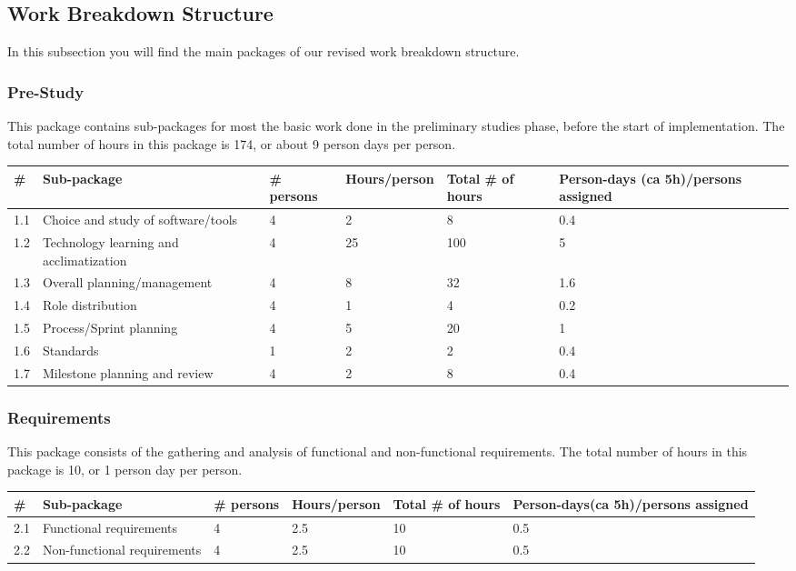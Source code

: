 \subsection{Work Breakdown Structure}
In this subsection you will find the main packages of our revised work breakdown structure.

\subsubsection{Pre-Study}
This package contains sub-packages for most the basic work done in the preliminary studies phase, before the start of implementation. The total number of hours in this package is 174, or about 9 person days per person.
\begin{longtable}{|p{0.7cm}|p{3cm}|p{1.8cm}|p{2.5cm}|p{2cm}|p{2.8cm}|}
\hline
\# & Sub-package & \# persons & Hours/person & Total \# of hours & Person-days (ca 5h)/persons assigned\\ 
\hline
1.1 & Choice and study of software/tools & 4 & 2 & 8 & 0.4\\ 
\hline
1.2 & Technology learning and acclimatization & 4 & 25 & 100 & 5\\ 
\hline
1.3 & Overall planning/management & 4 & 8 & 32 & 1.6\\ 
\hline
1.4 & Role distribution & 4 & 1 & 4 & 0.2\\ 
\hline
1.5 & Process/Sprint planning & 4 & 5 & 20 & 1\\ 
\hline
1.6 & Standards & 1 & 2 & 2 & 0.4\\ 
\hline
1.7 & Milestone planning and review & 4 & 2 & 8 & 0.4\\ 
\hline
\end{longtable}

\subsubsection{Requirements}
This package consists of the gathering and analysis of functional and non-functional requirements. The total number of hours in this package is 10, or 1 person day per person.
\begin{longtable}{|p{0.7cm}|p{3cm}|p{1.8cm}|p{2.5cm}|p{2cm}|p{2.8cm}|}
\hline
\# & Sub-package & \# persons & Hours/person & Total \# of hours & Person-days(ca 5h)/persons assigned\\ 
\hline
2.1 & Functional requirements & 4 & 2.5 & 10 & 0.5\\ 
\hline
2.2 & Non-functional requirements & 4 & 2.5 & 10 & 0.5\\ 
\hline
\end{longtable}

